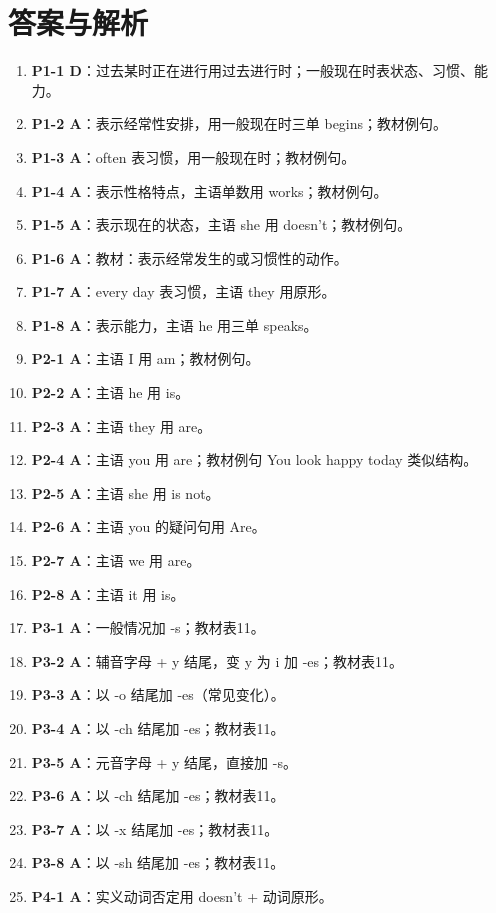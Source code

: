 \documentclass[11pt,a4paper]{ctexart}
\begin{document}
\section*{答案与解析}
\small
\begin{enumerate}[leftmargin=1.6em,itemsep=2pt]
\item \textbf{P1-1 D}：过去某时正在进行用过去进行时；一般现在时表状态、习惯、能力。
\item \textbf{P1-2 A}：表示经常性安排，用一般现在时三单 begins；教材例句。
\item \textbf{P1-3 A}：often 表习惯，用一般现在时；教材例句。
\item \textbf{P1-4 A}：表示性格特点，主语单数用 works；教材例句。
\item \textbf{P1-5 A}：表示现在的状态，主语 she 用 doesn’t；教材例句。
\item \textbf{P1-6 A}：教材：表示经常发生的或习惯性的动作。
\item \textbf{P1-7 A}：every day 表习惯，主语 they 用原形。
\item \textbf{P1-8 A}：表示能力，主语 he 用三单 speaks。
\item \textbf{P2-1 A}：主语 I 用 am；教材例句。
\item \textbf{P2-2 A}：主语 he 用 is。
\item \textbf{P2-3 A}：主语 they 用 are。
\item \textbf{P2-4 A}：主语 you 用 are；教材例句 You look happy today 类似结构。
\item \textbf{P2-5 A}：主语 she 用 is not。
\item \textbf{P2-6 A}：主语 you 的疑问句用 Are。
\item \textbf{P2-7 A}：主语 we 用 are。
\item \textbf{P2-8 A}：主语 it 用 is。
\item \textbf{P3-1 A}：一般情况加 -s；教材表11。
\item \textbf{P3-2 A}：辅音字母 + y 结尾，变 y 为 i 加 -es；教材表11。
\item \textbf{P3-3 A}：以 -o 结尾加 -es（常见变化）。
\item \textbf{P3-4 A}：以 -ch 结尾加 -es；教材表11。
\item \textbf{P3-5 A}：元音字母 + y 结尾，直接加 -s。
\item \textbf{P3-6 A}：以 -ch 结尾加 -es；教材表11。
\item \textbf{P3-7 A}：以 -x 结尾加 -es；教材表11。
\item \textbf{P3-8 A}：以 -sh 结尾加 -es；教材表11。
\item \textbf{P4-1 A}：实义动词否定用 doesn’t + 动词原形。

\end{enumerate}
\end{document}
